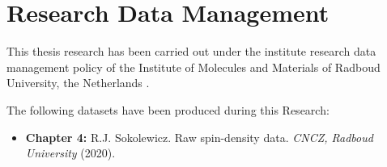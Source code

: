 \chapter{Research Data Management}
This thesis research has been carried out under the institute research data management policy of the Institute of Molecules and Materials of Radboud University, the Netherlands \cite{data_management_policy}.

The following datasets have been produced during this Research:

\begin{itemize}
    \item \textbf{Chapter 4:} R.J. Sokolewicz. Raw spin-density data. \emph{CNCZ, Radboud University} (2020). 
\end{itemize}

